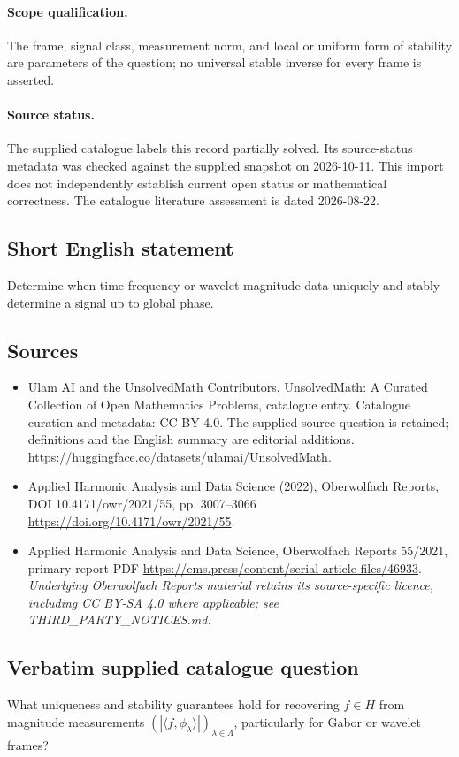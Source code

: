 \documentclass[11pt]{article}
\begin{document}
\paragraph{Scope qualification.}
The frame, signal class, measurement norm, and local or uniform form of stability are parameters of the question; no universal stable inverse for every frame is asserted.
\paragraph{Source status.}
The supplied catalogue labels this record partially solved. Its source-status metadata was checked against the supplied snapshot on 2026-10-11. This import does not independently establish current open status or mathematical correctness. The catalogue literature assessment is dated 2026-08-22.
\subsection{Short English statement}
Determine when time-frequency or wavelet magnitude data uniquely and stably determine a signal up to global phase.
\subsection{Sources}
\begin{itemize}
\item[S1] Ulam AI and the UnsolvedMath Contributors, UnsolvedMath: A Curated Collection of Open Mathematics Problems, catalogue entry. Catalogue curation and metadata: CC BY 4.0. The supplied source question is retained; definitions and the English summary are editorial additions.
\url{https://huggingface.co/datasets/ulamai/UnsolvedMath}.
\item[S2] Applied Harmonic Analysis and Data Science (2022), Oberwolfach Reports, DOI 10.4171/owr/2021/55, pp. 3007--3066
\url{https://doi.org/10.4171/owr/2021/55}.
\item[S3] Applied Harmonic Analysis and Data Science, Oberwolfach Reports 55/2021, primary report PDF
\url{https://ems.press/content/serial-article-files/46933}.
\textit{Underlying Oberwolfach Reports material retains its source-specific licence, including CC BY-SA 4.0 where applicable; see THIRD\_PARTY\_NOTICES.md.}
\end{itemize}
\subsection{Verbatim supplied catalogue question}
What uniqueness and stability guarantees hold for recovering $f\in H$ from magnitude measurements $(|\langle f,\phi_\lambda\rangle|)_{\lambda\in\Lambda}$, particularly for Gabor or wavelet frames?
\end{document}
